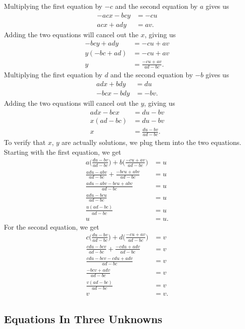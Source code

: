 \documentclass[12pt]{article}
\begin{document}
Multiplying the first equation by $-c$ and the second equation by $a$ gives us
\begin{align*}
-acx-bcy&=-cu \\
acx+ady&=av.
\end{align*}
Adding the two equations will cancel out the $x$, giving us
\begin{align*}
-bcy+ady&=-cu+av \\
y(-bc+ad)&=-cu+av \\
y&=\displaystyle \frac{-cu+av}{ad-bc}.
\end{align*}
Multiplying the first equation by $d$ and the second equation by $-b$ gives us
\begin{align*}
adx+bdy&=du \\
-bcx-bdy&=-bv.
\end{align*}
Adding the two equations will cancel out the $y$, giving us
\begin{align*}
adx-bcx&=du-bv \\
x(ad-bc)&=du-bv \\
x&=\displaystyle \frac{du-bv}{ad-bc}.
\end{align*}
To verify that $x$, $y$ are actually solutions, we plug them into the two equations. Starting with the first equation, we get
\begin{align*}
a\bigg(\displaystyle \frac{du-bv}{ad-bc}\bigg)+b\bigg(\displaystyle \frac{-cu+av}{ad-bc}\bigg)&=u \\
\displaystyle \frac{adu-abv}{ad-bc}+\displaystyle \frac{-bcu+abv}{ad-bc}&=u \\
\displaystyle \frac{adu-abv-bcu+abv}{ad-bc}&=u \\
\displaystyle \frac{adu-bcu}{ad-bc}&=u \\
\displaystyle \frac{u(ad-bc)}{ad-bc}&=u \\
u&=u.
\end{align*}
For the second equation, we get
\begin{align*}
c\bigg(\displaystyle \frac{du-bv}{ad-bc}\bigg)+d\bigg(\displaystyle \frac{-cu+av}{ad-bc}\bigg)&=v \\
\displaystyle \frac{cdu-bcv}{ad-bc}+\displaystyle \frac{-cdu+adv}{ad-bc}&=v \\
\displaystyle \frac{cdu-bcv-cdu+adv}{ad-bc}&=v \\
\displaystyle \frac{-bcv+adv}{ad-bc}&=v \\
\displaystyle \frac{v(ad-bc)}{ad-bc}&=v \\
v&=v.
\end{align*}
\subsection{Equations In Three Unknowns}
\end{document}

